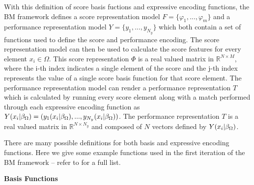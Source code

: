 With this definition of score basis fuctions and expressive encoding functions, the BM framework defines a score representation model $F = \{\varphi_1, ..., \varphi_m\}$ and a performance representation model $Y = \{y_1, ..., y_{N_y}\}$ which both contain a set of functions used to define the score and performance encoding. The score representation model can then be used to calculate the score features for every element $x_i \in \Omega$. This score representation $\Phi$ is a real valued matrix in $\mathbb{R}^{N \times M}$, where the i-th index indicates a single element of the score and the j-th index represents the value of a single score basis function for that score element. The performance representation model can render a performance representation $T$ which is calculated by running every score element along with a match performed through each expressive encoding function as $Y(x_i \vert \beta_{\Omega}) = (y_1(x_i \vert \beta_{\Omega}), ... ,y_{N_y}(x_i \vert \beta_{\Omega}))$. The performance representation $T$ is a real valued matrix in $\mathbb{R}^{N \times N_y}$ and composed of $N$ vectors defined by $Y(x_i \vert \beta_{\Omega})$. 

There are many possible definitions for both basis and expressive encoding functions. Here we give some example functions used in the first iteration of the BM framework -- refer to \citet{eduardo2018computational} for a full list. 

\textbf{Basis Functions}

